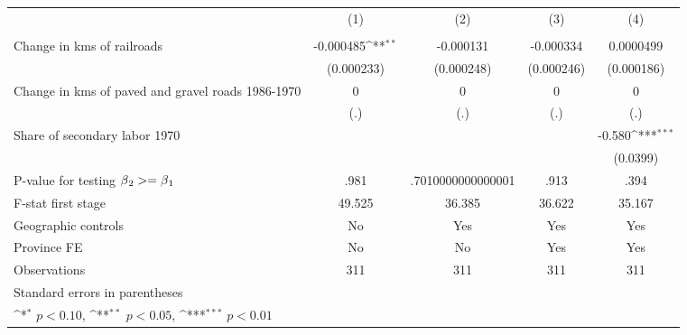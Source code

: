 {
\def\sym#1{\ifmmode^{#1}\else\(^{#1}\)\fi}
\begin{tabular}{l*{4}{c}}
\hline\hline
                &\multicolumn{1}{c}{(1)}&\multicolumn{1}{c}{(2)}&\multicolumn{1}{c}{(3)}&\multicolumn{1}{c}{(4)}\\
                &\multicolumn{1}{c}{}&\multicolumn{1}{c}{}&\multicolumn{1}{c}{}&\multicolumn{1}{c}{}\\
\hline
Change in kms of railroads&-0.000485\sym{**} &-0.000131         &-0.000334         &0.0000499         \\
                &(0.000233)         &(0.000248)         &(0.000246)         &(0.000186)         \\
[1em]
Change in kms of paved and gravel roads 1986-1970&        0         &        0         &        0         &        0         \\
                &      (.)         &      (.)         &      (.)         &      (.)         \\
[1em]
Share of secondary labor 1970&                  &                  &                  &   -0.580\sym{***}\\
                &                  &                  &                  & (0.0399)         \\
\hline
P-value for testing $\beta\\_2 >= \beta\\_1$&     .981         &.7010000000000001         &     .913         &     .394         \\
F-stat first stage&   49.525         &   36.385         &   36.622         &   35.167         \\
Geographic controls&       No         &      Yes         &      Yes         &      Yes         \\
Province FE     &       No         &       No         &      Yes         &      Yes         \\
Observations    &      311         &      311         &      311         &      311         \\
\hline\hline
\multicolumn{5}{l}{\footnotesize Standard errors in parentheses}\\
\multicolumn{5}{l}{\footnotesize \sym{*} \(p<0.10\), \sym{**} \(p<0.05\), \sym{***} \(p<0.01\)}\\
\end{tabular}
}
